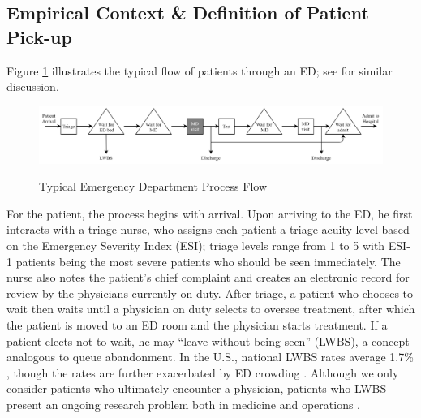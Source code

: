 \begin{table}[htbp]
  \label{tab:sum_stats}%
 \end{table} %

 \subsection{Empirical Context \& Definition of Patient Pick-up} \label{emp_context}
 Figure \ref{fig:ed_flow} illustrates the typical flow of patients through an ED; see \cite{Batt2017} for similar discussion.
 
 \begin{figure}[!b]
     \centering
     \caption{Typical Emergency Department Process Flow } \smallskip
     \includegraphics[scale=.7]{Figures/PU/ED Patient Flow-ED Patient Flow.png}     
     \label{fig:ed_flow}
 \end{figure}  
 
 For the patient, the process begins with arrival. Upon arriving to the ED, he first interacts with a triage nurse, who assigns each patient a triage acuity level based on the Emergency Severity Index (ESI); triage levels range from 1 to 5 with ESI-1 patients being the most severe patients who should be seen immediately. The nurse also notes the patient’s chief complaint and creates an electronic record for review by the physicians currently on duty. After triage, a patient who chooses to wait then waits until a physician on duty selects to oversee treatment, after which the patient is moved to an ED room and the physician starts treatment. If a patient elects not to wait, he may “leave without being seen” (LWBS), a concept analogous to queue abandonment. In the U.S., national LWBS rates average 1.7\% \citep{Pham2009,Moe2016}, though the rates are further exacerbated by ED crowding \citep{Batt2015}. Although we only consider patients who ultimately encounter a physician, patients who LWBS present an ongoing research problem both in medicine and operations \citep{Saghafian2015,Song2018}. 
 
